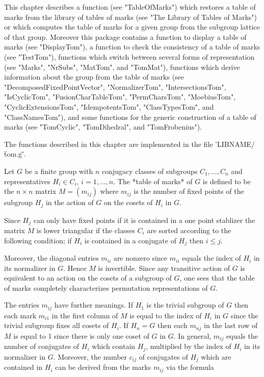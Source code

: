 This chapter describes a  function (see  "TableOfMarks") which restores a
table  of  marks from the  {\GAP}  library  of tables  of marks (see "The
Library of Tables of Marks") or which computes the table  of marks  for a
given  group from  the  subgroup lattice  of  that group.   Moreover this
package   contains   a   function  to  display  a  table  of  marks  (see
"DisplayTom"), a function to  check the consistency of  a table  of marks
(see  "TestTom"),  functions   which  switch  between  several  forms  of
representation (see "Marks", "NrSubs", "MatTom", and "TomMat"), functions
which derive  information about the  group  from  the table of marks (see
"DecomposedFixedPointVector",     "NormalizerTom",    "IntersectionsTom",
"IsCyclicTom",   "FusionCharTableTom",    "PermCharsTom",   "MoebiusTom",
"CyclicExtensionsTom",     "IdempotentsTom",     "ClassTypesTom",     and
"ClassNamesTom"),  and  some  functions for the generic construction of a
table of marks (see "TomCyclic", "TomDihedral", and "TomFrobenius").

The  functions described  in this  chapter are  implemented  in the  file
'LIBNAME/\"tom.g\"'.


Let  $G$ be a finite  group with $n$ conjugacy classes of subgroups $C_1,
\ldots, C_n$ and representatives $H_i \in  C_i$, $i = 1, \ldots, n$.  The
*table of  marks*  of $G$  is defined  to  be the  $n  \times  n$  matrix
$M  = (m_{ij})$  where $m_{ij}$  is the  number  of fixed points  of  the
subgroup $H_j$ in the action of $G$ on the cosets of $H_i$ in $G$.

Since $H_j$ can only have fixed points if it is contained in a one  point
stablizer the  matrix $M$ is  lower  triangular  if the classes $C_i$ are
sorted according to the following condition; if $H_i$ is  contained in  a
conjugate of $H_j$ then $i \leq j$.

Moreover, the diagonal entries $m_{ii}$ are nonzero since $m_{ii}$ equals
the index of  $H_i$  in its normalizer in $G$.  Hence  $M$ is invertible.
Since  any transitive action of  $G$ is  equivalent  to an action on  the
cosets of a subgroup of $G$, one sees that the table of  marks completely
characterizes permutation representations of $G$.

The entries $m_{ij}$  have further  meanings.  If  $H_1$  is the  trivial
subgroup of  $G$ then  each mark $m_{i1}$  in the first column  of $M$ is
equal to the index of $H_i$ in  $G$ since the trivial  subgroup fixes all
cosets of $H_i$.  If $H_n = G$ then each $m_{nj}$  in the last row of $M$
is equal  to 1 since there is only  one coset of $G$ in $G$.  In general,
$m_{ij}$  equals the  number of conjugates of $H_i$ which  contain $H_j$,
multiplied by the index of $H_i$ in its normalizer in $G$.  Moreover, the
number $c_{ij}$ of  conjugates of $H_j$ which are contained in $H_i$  can
be derived from the marks $m_{ij}$ via the formula

